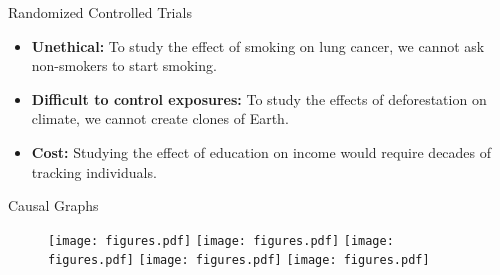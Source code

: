 \documentclass[aspectratio=169]{beamer}
\begin{document}
\begin{frame}{Randomized Controlled Trials}
	
	\vspace{2em}

	\begin{itemize}[<+->]
		\item \textbf{Unethical: } To study the effect of smoking on lung cancer, we cannot ask non-smokers to start smoking.
		\item \textbf{Difficult to control exposures:} To study the effects of deforestation on climate, we cannot create clones of Earth.
		\item \textbf{Cost:} Studying the effect of education on income would require decades of tracking individuals.
	\end{itemize}

	\vspace{2em}

\end{frame}

\begin{frame}{Causal Graphs}
	\vspace{0.5em}
	\begin{figure}
		\begin{overprint}
			 \center \texttt{[image: figures.pdf]}
			\onslide<2> \center \texttt{[image: figures.pdf]}
			\onslide<3> \center \texttt{[image: figures.pdf]}
			\onslide<4> \center \texttt{[image: figures.pdf]}
			\onslide<5> \center \texttt{[image: figures.pdf]}
		\end{overprint}
	\end{figure}

\end{frame}

% 
% 
% 
\end{document}
